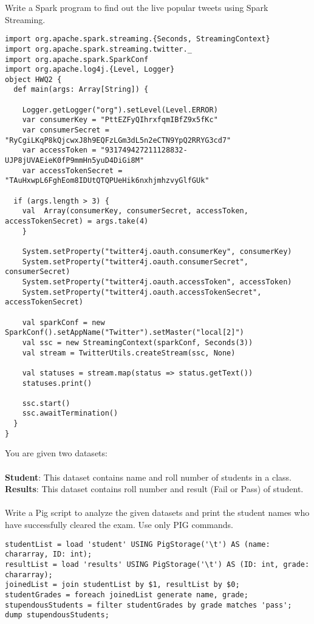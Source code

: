 \documentclass[11pt]{article}
\newcommand{\ques}[1]{\noindent {\bf Question #1: }}
\begin{document}
\ques{2} Write a Spark program to find out the live popular tweets using Spark Streaming. 
\begin{lstlisting}
import org.apache.spark.streaming.{Seconds, StreamingContext}
import org.apache.spark.streaming.twitter._
import org.apache.spark.SparkConf
import org.apache.log4j.{Level, Logger}
object HWQ2 {
  def main(args: Array[String]) {
  
    Logger.getLogger("org").setLevel(Level.ERROR)
    var consumerKey = "PttEZFyQIhrxfqmIBfZ9x5fKc"
    var consumerSecret = "RyCgiLKqP8kQjcwxJ8h9EQFzLGm3dL5n2eCTN9YpQ2RRYG3cd7"
    var accessToken = "931749427211128832-UJP8jUVAEieK0fP9mmHn5yuD4DiGi8M"
    var accessTokenSecret = "TAuHxwpL6FghEom8IDUtQTQPUeHik6nxhjmhzvyGlfGUk"

  if (args.length > 3) {
    val  Array(consumerKey, consumerSecret, accessToken, accessTokenSecret) = args.take(4)
    }

    System.setProperty("twitter4j.oauth.consumerKey", consumerKey)
    System.setProperty("twitter4j.oauth.consumerSecret", consumerSecret)
    System.setProperty("twitter4j.oauth.accessToken", accessToken)
    System.setProperty("twitter4j.oauth.accessTokenSecret", accessTokenSecret)
    
    val sparkConf = new SparkConf().setAppName("Twitter").setMaster("local[2]")
    val ssc = new StreamingContext(sparkConf, Seconds(3))
    val stream = TwitterUtils.createStream(ssc, None)
    
    val statuses = stream.map(status => status.getText())
    statuses.print()
    
    ssc.start()
    ssc.awaitTermination()
  }
}
\end{lstlisting} \newpage

\ques{3} You are given two datasets: \\~\\
\textbf{Student}: This dataset contains name and roll number of students in a class. \\
\textbf{Results}: This dataset contains roll number and result (Fail or Pass) of student. 
\\~\\
Write a Pig script to analyze the given datasets and print the student names who have successfully cleared the exam. Use only PIG commands. 

\begin{lstlisting}
studentList = load 'student' USING PigStorage('\t') AS (name: chararray, ID: int);
resultList = load 'results' USING PigStorage('\t') AS (ID: int, grade: chararray);
joinedList = join studentList by $1, resultList by $0;
studentGrades = foreach joinedList generate name, grade;
stupendousStudents = filter studentGrades by grade matches 'pass';
dump stupendousStudents;
\end{lstlisting}
\end{document}
